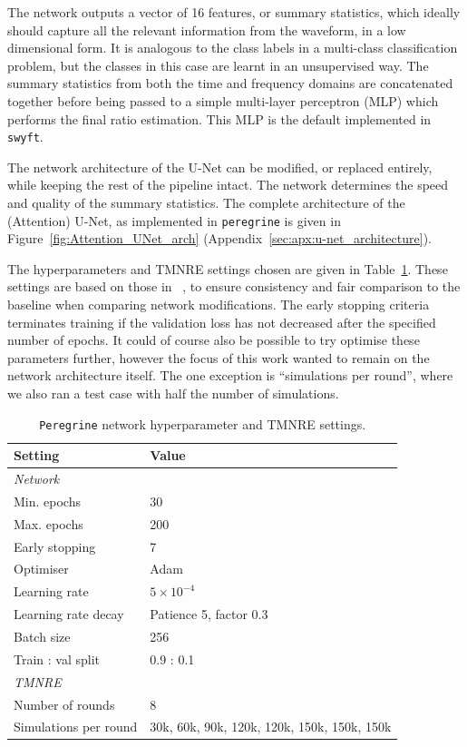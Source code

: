 The network outputs a vector of 16 features, or summary statistics, which ideally should capture all the relevant information from the waveform, in a low dimensional form. It is analogous to the class labels in a multi-class classification problem, but the classes in this case are learnt in an unsupervised way. The summary statistics from both the time and frequency domains are concatenated together before being passed to a simple multi-layer perceptron (MLP) which performs the final ratio estimation. This MLP is the default implemented in \texttt{swyft}.

The network architecture of the U-Net can be modified, or replaced entirely, while keeping the rest of the pipeline intact. The network determines the speed and quality of the summary statistics. The complete architecture of the (Attention) U-Net, as implemented in \texttt{peregrine} is given in Figure~\ref{fig:Attention_UNet_arch} (Appendix~\ref{sec:apx:u-net_architecture}).

The hyperparameters and TMNRE settings chosen are given in Table~\ref{tab:default_run_settings}. These settings are based on those in ~\cite{bhardwaj2023peregrine}, to ensure consistency and fair comparison to the baseline when comparing network modifications. The early stopping criteria terminates training if the validation loss has not decreased after the specified number of epochs. It could of course also be possible to try optimise these parameters further, however the focus of this work wanted to remain on the network architecture itself. The one exception is \enquote{simulations per round}, where we also ran a test case with half the number of simulations.



\begin{table}
    \centering
    \caption{\texttt{Peregrine} network hyperparameter and TMNRE settings.}
    \label{tab:default_run_settings}
    \begin{tabular}{ll}
         \toprule
         \textbf{Setting}  & 
         \textbf{Value} \\
         \midrule
         \textit{Network} & \\
         Min. epochs & 30 \\
         Max. epochs & 200 \\
         Early stopping & 7 \\
         Optimiser & Adam \\
         Learning rate & $5\times10^{-4}$\\
         Learning rate decay & Patience 5, factor 0.3\\
         Batch size & 256\\
         Train : val split & 0.9 : 0.1\\
         \midrule
         \textit{TMNRE} & \\
         Number of rounds & 8 \\
         Simulations per round & \multicolumn{1}{p{4cm}}{\raggedright 30k, 60k, 90k, 120k, 120k, 150k, 150k, 150k} \\
         \bottomrule
    \end{tabular}
    \myvspacecommand
\end{table}

